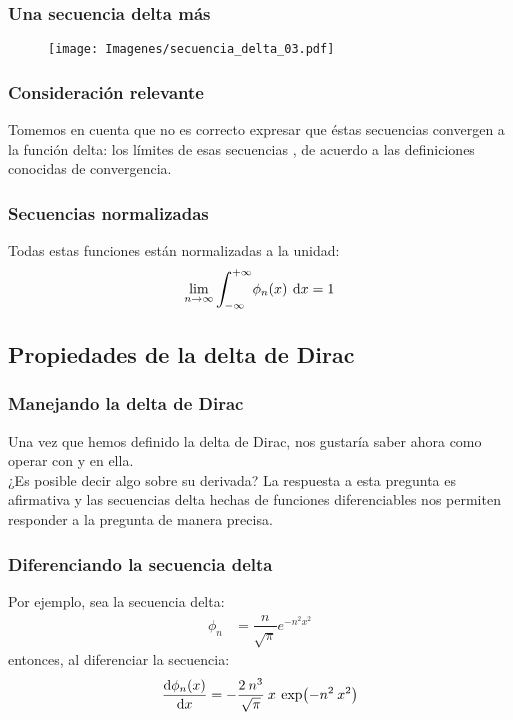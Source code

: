 \documentclass[12pt]{beamer}
\begin{document}
\begin{frame}
\frametitle{Una secuencia delta más}
\begin{figure}[H]
    \centering
    \texttt{[image: Imagenes/secuencia\_delta\_03.pdf]}
    \label{fig:plot_secuencia_03}
\end{figure}
\end{frame}

\begin{frame}
\frametitle{Consideración relevante}
Tomemos en cuenta que no es correcto expresar que éstas secuencias convergen a la función delta: \pause los límites de esas secuencias , de acuerdo a las definiciones conocidas de convergencia.
\end{frame}

\begin{frame}
\frametitle{Secuencias normalizadas}
Todas estas funciones están normalizadas a la unidad:
\pause
\begin{equation}
\lim_{n \to \infty} \scaleint{6ex}_{\bs - \infty}^{+ \infty} \phi_{n} (x) \: \dd{x} = 1
\label{eq:ecuacion_delta_05}
\end{equation}
\end{frame}

\subsection{Propiedades de la delta de Dirac}

\begin{frame}
\frametitle{Manejando la delta de Dirac}
Una vez que hemos definido la delta de Dirac, nos gustaría saber ahora como operar con y en ella. 
\\
\bigskip
\pause
¿Es posible decir algo sobre su derivada? \pause La respuesta a esta pregunta es afirmativa y las secuencias delta hechas de funciones diferenciables nos permiten responder a la pregunta de manera precisa.
\end{frame}

\begin{frame}
\frametitle{Diferenciando la secuencia delta}
Por ejemplo, sea la secuencia delta:
\pause
\begin{align*}
\phi_{n} &= \dfrac{n}{\sqrt{\pi}} e^{-n^{2} x^{2}}
\end{align*}
\pause
entonces, al diferenciar la secuencia:
\pause
\begin{align*}
\dv{\phi_{n}(x)}{x} = - \dfrac{2 \: n^{3}}{\sqrt{\pi}} \: x \: \exp(-n^{2} \: x^{2})
\end{align*}
\end{frame}
\end{document}
